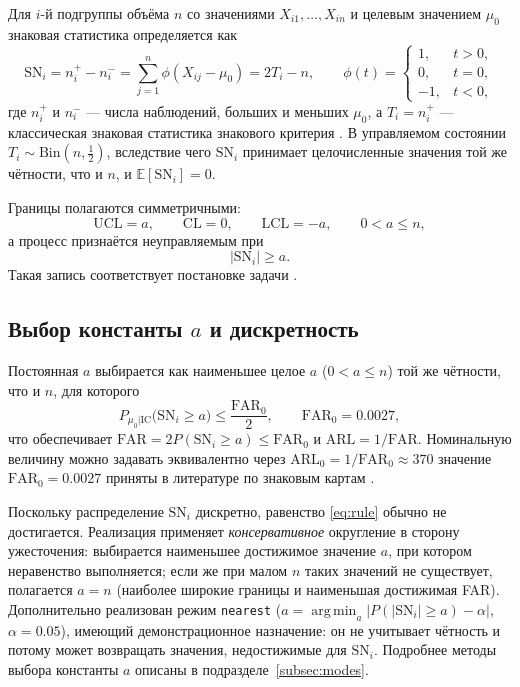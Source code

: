 \documentclass[11pt,a4paper]{article}
\newcommand{\SN}{\mathrm{SN}}
\DeclareMathOperator*{\argmin}{arg\,min}
\begin{document}
Для $i$-й подгруппы объёма $n$ со значениями $X_{i1},\dots,X_{in}$ и целевым
значением $\mu_0$ знаковая статистика определяется как
\begin{equation}
  \SN_i = n_i^{+} - n_i^{-}
        = \sum_{j=1}^{n}\phi(X_{ij}-\mu_0)
        = 2T_i - n,
  \qquad
  \phi(t) = \begin{cases} 1, & t>0,\\ 0, & t=0,\\ -1, & t<0,\end{cases}
  \label{eq:sn}
\end{equation}
где $n_i^{+}$ и $n_i^{-}$ --- числа наблюдений, больших и меньших $\mu_0$, а
$T_i = n_i^{+}$ --- классическая знаковая статистика знакового критерия
\cite{Amin1995, Gibbons2010}. В управляемом состоянии
$T_i \sim \mathrm{Bin}(n,\tfrac12)$, вследствие чего $\SN_i$ принимает
целочисленные значения той же чётности, что и $n$, и
$\mathbb{E}[\SN_i]=0$.

Границы полагаются симметричными:
\begin{equation}
  \mathrm{UCL} = a, \qquad \mathrm{CL} = 0, \qquad \mathrm{LCL} = -a,
  \qquad 0<a\le n,
  \label{eq:limits}
\end{equation}
а процесс признаётся неуправляемым при
\begin{equation}
  |\SN_i| \ge a.
  \label{eq:signal}
\end{equation}
Такая запись соответствует постановке задачи
\cite{Amin1995, Chakraborti2019}.

\subsection{Выбор константы $a$ и дискретность}

Постоянная $a$ выбирается как наименьшее целое $a$ ($0<a\le n$) той же
чётности, что и $n$, для которого
\begin{equation}
  P_{\mu_0|\mathrm{IC}}\bigl(\SN_i \ge a\bigr) \le \frac{\mathrm{FAR}_0}{2},
  \qquad \mathrm{FAR}_0 = 0.0027,
  \label{eq:rule}
\end{equation}
что обеспечивает $\mathrm{FAR} = 2P(\SN_i\ge a) \le \mathrm{FAR}_0$ и
$\mathrm{ARL} = 1/\mathrm{FAR}$. Номинальную величину можно задавать
эквивалентно через $\mathrm{ARL}_0=1/\mathrm{FAR}_0\approx370$ значение $\mathrm{FAR}_0=0.0027$ приняты в литературе 
по знаковым картам \cite{Amin1995, Chakraborti2019}.

Поскольку распределение $\SN_i$ дискретно, равенство
\eqref{eq:rule} обычно не достигается. Реализация применяет
\emph{консервативное} округление в сторону ужесточения: выбирается
наименьшее достижимое значение $a$, при котором неравенство выполняется;
если же при малом $n$ таких значений не существует, полагается $a=n$
(наиболее широкие границы и наименьшая достижимая FAR). Дополнительно реализован режим
\texttt{nearest} ($a=\argmin_a |P(|\SN_i|\ge a)-\alpha|$, $\alpha=0.05$),
имеющий демонстрационное назначение: он не учитывает чётность и потому может
возвращать значения, недостижимые для $\SN_i$. Подробнее методы выбора
константы $a$ описаны в подразделе~\ref{subsec:modes}.
\end{document}
